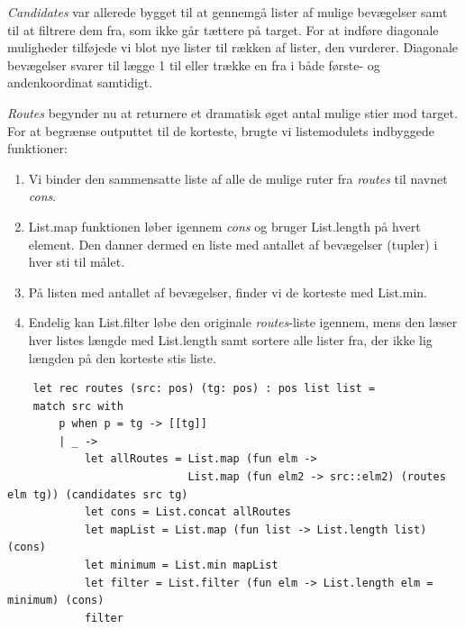 \documentclass{article}
\begin{document}
\emph{Candidates} var allerede bygget til at gennemgå lister af mulige bevægelser samt til at filtrere dem fra, som ikke går tættere på target. For at indføre diagonale muligheder tilføjede vi blot nye lister til rækken af lister, den vurderer. Diagonale bevægelser svarer til lægge 1 til eller trække en fra i både første- og andenkoordinat samtidigt.

\emph{Routes} begynder nu at returnere et dramatisk øget antal mulige stier mod target. For at begrænse outputtet til de korteste, brugte vi listemodulets indbyggede funktioner:
\begin{enumerate}
    \item Vi binder den sammensatte liste af alle de mulige ruter fra \emph{routes} til navnet \emph{cons}.
    
    \item List.map funktionen løber igennem \emph{cons} og bruger List.length på hvert element. Den danner dermed en liste med antallet af bevægelser (tupler) i hver sti til målet.
    
    \item På listen med antallet af bevægelser, finder vi de korteste med List.min.
    
    \item Endelig kan List.filter løbe den originale \emph{routes}-liste igennem, mens den læser hver listes længde med List.length samt sortere alle lister fra, der ikke lig længden på den korteste stis liste.
\end{enumerate}
\begin{verbatim}
    let rec routes (src: pos) (tg: pos) : pos list list =
    match src with 
        p when p = tg -> [[tg]]   
        | _ -> 
            let allRoutes = List.map (fun elm -> 
                            List.map (fun elm2 -> src::elm2) (routes elm tg)) (candidates src tg)
            let cons = List.concat allRoutes 
            let mapList = List.map (fun list -> List.length list) (cons)
            let minimum = List.min mapList
            let filter = List.filter (fun elm -> List.length elm = minimum) (cons)
            filter 
\end{verbatim}
\end{document}
